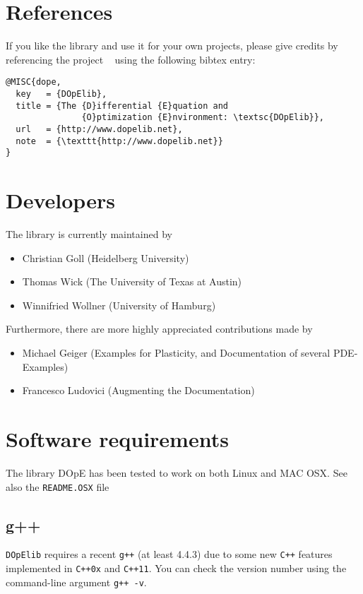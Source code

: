 \newpage
\section{References}
If you like the library and use it for your own projects, please give credits by 
referencing the project \dope{}~\cite{dope} using the following bibtex entry:

\begin{lstlisting}
@MISC{dope,
  key   = {DOpElib},
  title = {The {D}ifferential {E}quation and 
               {O}ptimization {E}nvironment: \textsc{DOpElib}},
  url   = {http://www.dopelib.net},
  note  = {\texttt{http://www.dopelib.net}}
}
\end{lstlisting}


\section{Developers}
\label{sec:contrib}
The library is currently maintained by 
\begin{itemize}
  \item Christian Goll (Heidelberg University)
  \item Thomas Wick (The University of Texas at Austin)
  \item Winnifried Wollner (University of Hamburg)
\end{itemize}

Furthermore, there are more highly appreciated contributions
made by %
\begin{itemize}
  \item Michael Geiger (Examples for Plasticity, and Documentation of several PDE-Examples)
  \item Francesco Ludovici (Augmenting the Documentation)
\end{itemize}

\section{Software requirements}
The library DOpE has been tested to work on both Linux and 
MAC OSX. See also the \texttt{README.OSX} file 

\subsection{g++}
\texttt{DOpElib} requires a recent \texttt{g++} (at least 4.4.3) due to 
some new \texttt{C++} features implemented in \texttt{C++0x} and \texttt{C++11}. 
You can check the version number using the command-line argument \texttt{g++ -v}.

